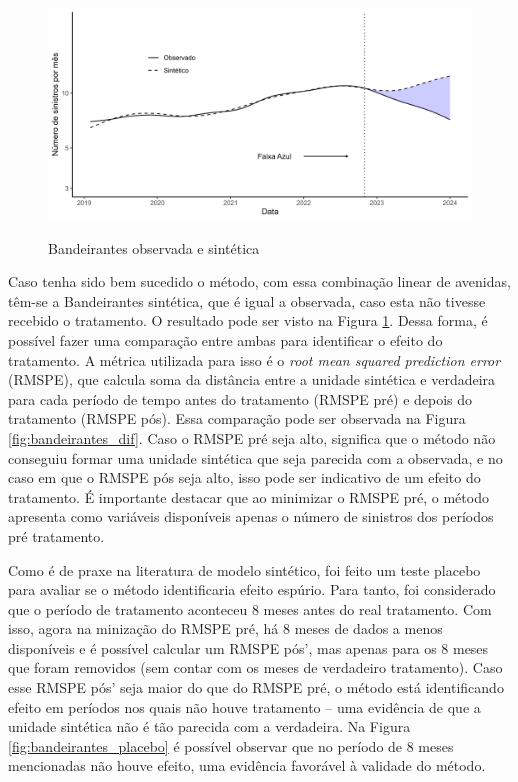 \begin{figure}[h]
    \centering
    \caption{Bandeirantes observada e sintética}
    \includegraphics[width=.8\linewidth]{relatorios/faixa-azul/figuras/sintetico.png}
    \label{fig:sintetic}
\end{figure}

Caso tenha sido bem sucedido o método, com essa combinação linear de avenidas, têm-se a Bandeirantes sintética, que é igual a observada, caso esta não tivesse recebido o tratamento. O resultado pode ser visto na Figura \ref{fig:sintetic}. Dessa forma, é possível fazer uma comparação entre ambas para identificar o efeito do tratamento. A métrica utilizada para isso é o \textit{root mean squared prediction error} (RMSPE), que calcula soma da distância entre a unidade sintética e verdadeira para cada período de tempo antes do tratamento (RMSPE pré) e depois do tratamento (RMSPE pós). Essa comparação pode ser observada na Figura \ref{fig:bandeirantes_dif}. Caso o RMSPE pré seja alto, significa que o método não conseguiu formar uma unidade sintética que seja parecida com a observada, e no caso em que o RMSPE pós seja alto, isso pode ser indicativo de um efeito do tratamento. É importante destacar que ao minimizar o RMSPE pré, o método apresenta como variáveis disponíveis apenas o número de sinistros dos períodos pré tratamento. 

Como é de praxe na literatura de modelo sintético, foi feito um teste placebo para avaliar se o método identificaria efeito espúrio. Para tanto, foi considerado que o período de tratamento aconteceu 8 meses antes do real tratamento. Com isso, agora na minização do RMSPE pré, há 8 meses de dados a menos disponíveis e é possível calcular um RMSPE pós', mas apenas para os 8 meses que foram removidos (sem contar com os meses de verdadeiro tratamento). Caso esse RMSPE pós' seja maior do que do RMSPE pré, o método está identificando efeito em períodos nos quais não houve tratamento -- uma evidência de que a unidade sintética não é tão parecida com a verdadeira. Na Figura \ref{fig:bandeirantes_placebo} é possível observar que no período de 8 meses mencionadas não houve efeito, uma evidência favorável à validade do método.

